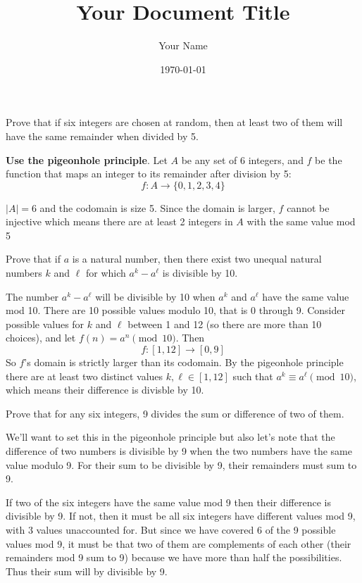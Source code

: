 \documentclass{article}
\title{Your Document Title}
\author{Your Name}
\date{\today} %
\begin{document}
\maketitle

\begin{problem}
Prove that if six integers are chosen at random, then at least two of them will have the same remainder when divided by 5.
\end{problem}

\textbf{Use the pigeonhole principle}. Let $A$ be any set of 6 integers, and $f$ be the function that maps an integer to its remainder after division by 5:
$$f: A \to \{0, 1, 2, 3, 4\}$$

$|A| = 6$ and the codomain is size 5. Since the domain is larger, $f$ cannot be injective which means there are at least 2 integers in $A$ with the same value mod 5

\begin{problem}
Prove that if $a$ is a natural number, then there exist two unequal natural numbers $k$ and $\ell$ for which $a^k - a^\ell$ is divisible by 10.
\end{problem}

The number $a^k - a^\ell$ will be divisible by 10 when $a^k$ and $a^\ell$ have the same value mod 10. There are 10 possible values modulo 10, that is 0 through 9. Consider possible values for $k$ and $\ell$ between 1 and 12 (so there are more than 10 choices), and let $f(n) = a^n \pmod{10}$. Then
$$f: [1, 12] \to [0, 9]$$
So $f$'s domain is strictly larger than its codomain. By the pigeonhole principle there are at least two distinct values $k, \ell \in [1, 12]$ such that $a^k \equiv a^\ell \pmod{10}$, which means their difference is divisble by 10.

\begin{problem}
Prove that for any six integers, 9 divides the sum or difference of two of them.
\end{problem}

We'll want to set this in the pigeonhole principle but also let's note that the difference of two numbers is divisible by 9 when the two numbers have the same value modulo 9. For their sum to be divisible by 9, their remainders must sum to 9.

If two of the six integers have the same value mod 9 then their difference is divisible by 9. If not, then it must be all six integers have different values mod 9, with 3 values unaccounted for. But since we have covered 6 of the 9 possible values mod 9, it must be that two of them are complements of each other (their remainders mod 9 sum to 9) because we have more than half the possibilities. Thus their sum will by divisible by 9.
\end{document}

